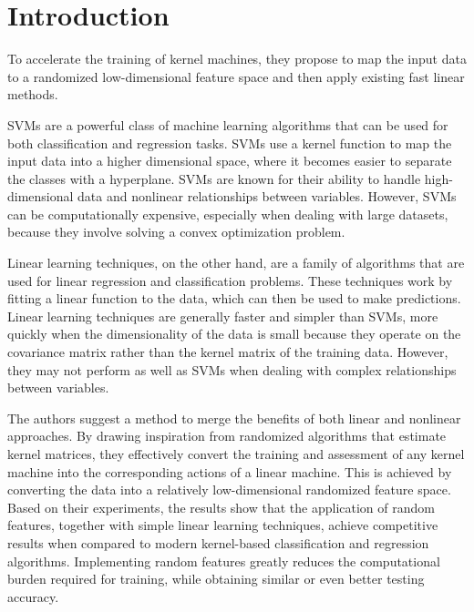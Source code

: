 \chapter{Introduction}

To accelerate the training of kernel machines, 
they propose to map the input data to a 
randomized low-dimensional  feature space and 
then apply existing fast linear methods.

SVMs are a powerful class of machine learning algorithms that can be used for both classification and regression tasks. 
SVMs use a kernel function to map the input data into a higher dimensional space, where it becomes easier to separate the classes with a hyperplane. 
SVMs are known for their ability to handle high-dimensional data and nonlinear relationships between variables. 
However, SVMs can be computationally expensive, especially when dealing with large datasets, because they involve solving a convex optimization problem.

Linear learning techniques, on the other hand, are a family of algorithms that are used for linear regression and classification problems.  These techniques work by fitting a linear function to the data, which can then be used to make predictions. Linear learning techniques are generally faster and simpler than SVMs, more quickly when the dimensionality of the data is small because they operate on the covariance matrix rather than the kernel matrix of the training data. However, they may not perform as well as SVMs when dealing with complex relationships between variables.


The authors suggest a method to merge the benefits of both linear and nonlinear approaches. By drawing inspiration from randomized algorithms that estimate kernel matrices, they effectively convert the training and assessment of any kernel machine into the corresponding actions of a linear machine. This is achieved by converting the data into a relatively low-dimensional randomized feature space. Based on their experiments, the results show that the application of random features, together with simple linear learning techniques, achieve competitive results when compared to modern kernel-based classification and regression algorithms. Implementing random features greatly reduces the computational burden required for training, while obtaining similar or even better testing accuracy.

